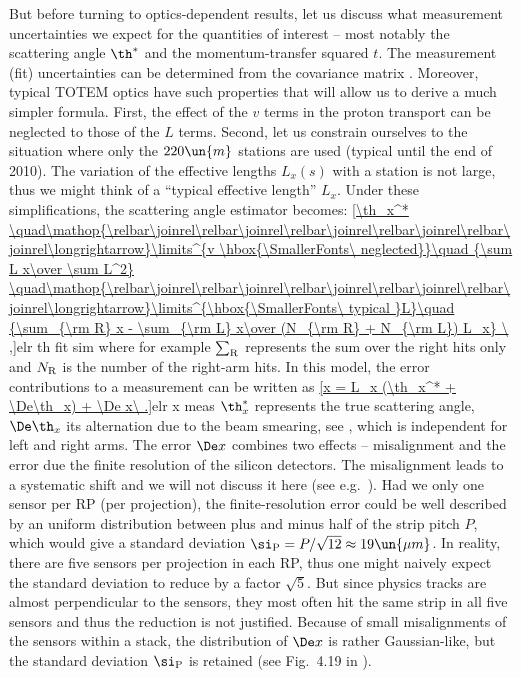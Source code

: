 But before turning to optics-dependent results, let us discuss what measurement uncertainties we expect for the quantities of interest -- most notably the scattering angle $\th^*$ and the momentum-transfer squared $t$. The measurement (fit) uncertainties can be determined from the covariance matrix . Moreover, typical TOTEM optics
have such properties that will allow us to derive a much simpler formula. First, the effect of the $v$ terms in the proton transport  can be neglected to those of the $L$ terms. Second, let us constrain ourselves to the situation where only the $220\un{m}$ stations are used (typical until the end of 2010). The variation of the effective lengths $L_x(s)$ with a station is not large, thus we might think of a ``typical effective length'' $L_x$. Under these simplifications, the scattering angle estimator becomes:
\eqref{\th_x^*
	\quad\mathop{\relbar\joinrel\relbar\joinrel\relbar\joinrel\relbar\joinrel\relbar\joinrel\longrightarrow}\limits^{v \hbox{\SmallerFonts\ neglected}}\quad
		{\sum L x\over \sum L^2}
	\quad\mathop{\relbar\joinrel\relbar\joinrel\relbar\joinrel\relbar\joinrel\relbar\joinrel\longrightarrow}\limits^{\hbox{\SmallerFonts\ typical }L}\quad
	{\sum_{\rm R} x - \sum_{\rm L} x\over (N_{\rm R} + N_{\rm L}) L_x}
\ ,}{elr th fit sim} 
where for example $\sum_{\rm R}$ represents the sum over the right hits only and $N_{\rm R}$ is the number of the right-arm hits. In this model, the error contributions to a measurement can be written as
\eqref{x = L_x (\th_x^* + \De\th_x) + \De x\ .}{elr x meas}
$\th_x^*$ represents the true scattering angle, $\De\th_x$ its alternation due to the beam smearing, see , which is independent for left and right arms. The error $\De x$ combines two effects -- misalignment and the error due the finite resolution of the silicon detectors. The misalignment leads to a systematic shift and we will not discuss it here (see e.g.~). Had we only one sensor per RP (per projection), the finite-resolution error could be well described by an uniform distribution between plus and minus half of the strip pitch $P$, which would give a standard deviation $\si_{\rm P} = P/\sqrt{12}\approx 19\un{\mu m}$. In reality, there are five sensors per projection in each RP, thus one might naively expect the standard deviation to reduce by a factor $\sqrt 5$. But since physics tracks are almost perpendicular to the sensors, they most often hit the same strip in all five sensors and thus the reduction is not justified. Because of small misalignments of the sensors within a stack, the distribution of $\De x$ is rather Gaussian-like, but the standard deviation $\si_{\rm P}$ is retained (see Fig.~4.19 in ).

